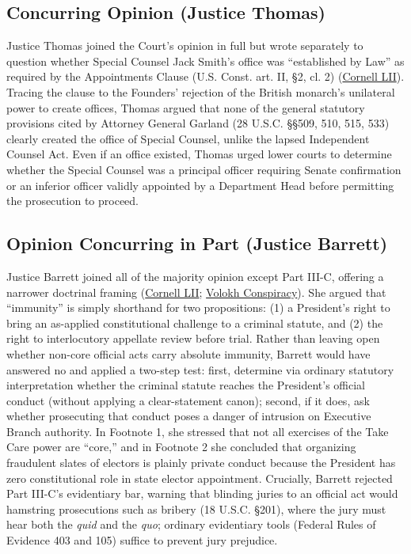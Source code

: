 \documentclass[12pt]{article}
\begin{document}
\subsection{Concurring Opinion (Justice Thomas)}

Justice Thomas joined the Court's opinion in full but wrote separately to question whether Special Counsel Jack Smith's office was ``established by Law'' as required by the Appointments Clause (U.S. Const. art. II, \S 2, cl. 2) (\href{https://www.law.cornell.edu/supremecourt/text/23-939}{Cornell LII}). Tracing the clause to the Founders' rejection of the British monarch's unilateral power to create offices, Thomas argued that none of the general statutory provisions cited by Attorney General Garland (28 U.S.C. \S\S 509, 510, 515, 533) clearly created the office of Special Counsel, unlike the lapsed Independent Counsel Act. Even if an office existed, Thomas urged lower courts to determine whether the Special Counsel was a principal officer requiring Senate confirmation or an inferior officer validly appointed by a Department Head before permitting the prosecution to proceed.

\subsection{Opinion Concurring in Part (Justice Barrett)}

Justice Barrett joined all of the majority opinion except Part III-C, offering a narrower doctrinal framing (\href{https://www.law.cornell.edu/supremecourt/text/23-939}{Cornell LII}; \href{https://reason.com/volokh/2024/07/05/what-exactly-did-justice-barrett-agree-with-chief-justice-roberts-on-about-presidential-immunity/}{Volokh Conspiracy}). She argued that ``immunity'' is simply shorthand for two propositions: (1) a President's right to bring an as-applied constitutional challenge to a criminal statute, and (2) the right to interlocutory appellate review before trial. Rather than leaving open whether non-core official acts carry absolute immunity, Barrett would have answered no and applied a two-step test: first, determine via ordinary statutory interpretation whether the criminal statute reaches the President's official conduct (without applying a clear-statement canon); second, if it does, ask whether prosecuting that conduct poses a danger of intrusion on Executive Branch authority. In Footnote 1, she stressed that not all exercises of the Take Care power are ``core,'' and in Footnote 2 she concluded that organizing fraudulent slates of electors is plainly private conduct because the President has zero constitutional role in state elector appointment. Crucially, Barrett rejected Part III-C's evidentiary bar, warning that blinding juries to an official act would hamstring prosecutions such as bribery (18 U.S.C. \S 201), where the jury must hear both the \textit{quid} and the \textit{quo}; ordinary evidentiary tools (Federal Rules of Evidence 403 and 105) suffice to prevent jury prejudice.
\end{document}

